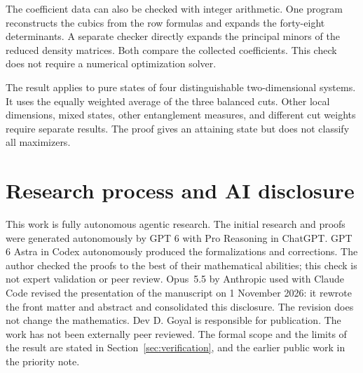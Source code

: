 \documentclass[11pt]{article}
\theoremstyle{definition}
\theoremstyle{remark}
\begin{document}
The coefficient data can also be checked with integer arithmetic. One program reconstructs the cubics from the row formulas and expands the forty-eight determinants. A separate checker directly expands the principal minors of the reduced density matrices. Both compare the collected coefficients. This check does not require a numerical optimization solver.

The result applies to pure states of four distinguishable two-dimensional systems. It uses the equally weighted average of the three balanced cuts. Other local dimensions, mixed states, other entanglement measures, and different cut weights require separate results. The proof gives an attaining state but does not classify all maximizers.

\section{Research process and AI disclosure}

This work is fully autonomous agentic research. The initial research and proofs were generated autonomously by GPT 6 with Pro Reasoning in ChatGPT. GPT 6 Astra in Codex autonomously produced the formalizations and corrections. The author checked the proofs to the best of their mathematical abilities; this check is not expert validation or peer review. Opus~5.5 by Anthropic used with Claude Code revised the presentation of the manuscript on 1 November 2026: it rewrote the front matter and abstract and consolidated this disclosure. The revision does not change the mathematics. Dev D. Goyal is responsible for publication. The work has not been externally peer reviewed. The formal scope and the limits of the result are stated in Section~\ref{sec:verification}, and the earlier public work in the priority note.
\end{document}
